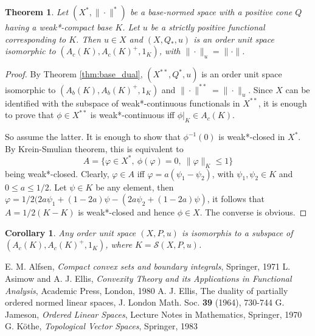 \documentclass[12pt]{article}
\newtheorem{thm}{Theorem}
\newtheorem{coro}{Corollary}
\theoremstyle{remark}
\newcommand{\<}{\langle}
\begin{document}
\begin{thm} Let $(X^*,\|\cdot\|^*)$ be a base-normed space with a positive cone $Q$ having a weak*-compact base $K$. Let $u$ be a strictly positive functional corresponding to $K$.  
Then $u\in X$ and $(X,Q_*,u)$ is an order unit space isomorphic to $(A_c(K),A_c(K)^+,1_K)$, with  $\|\cdot\|_u=\|\cdot\|$.

\end{thm}

\begin{proof}  By Theorem \ref{thm:base_dual}, $(X^{**},Q^*,u)$ is an order unit space  isomorphic to $(A_b(K),A_b(K)^+,1_K)$
 and $\|\cdot\|^{**}=\|\cdot\|_u$. Since $X$ can be identified with the subspace of weak*-continuous functionals in $X^{**}$, it is enough to prove that $\phi\in X^{**}$ is weak*-continuous iff $\phi|_K\in A_c(K)$. 

So assume the latter. It is enough to show that $\phi^{-1}(0)$ is weak*-closed in $X^*$. By Krein-Smulian theorem, this is equivalent to 
\[
A=\{\varphi\in X^*,\ \phi(\varphi)=0,\ \|\varphi\|_K\le 1\}
\]
being weak*-closed. Clearly, $\varphi\in A$ iff $\varphi=a(\psi_1-\psi_2)$, with $\psi_1,\psi_2\in K$ and $0\le a\le 1/2$. Let $\psi\in K$ be any element, then $\varphi= 1/2(2a\psi_1+(1-2a)\psi -(2a\psi_2+(1-2a)\psi)$, it follows that $A=1/2(K-K)$ 
 is weak*-closed and hence $\phi\in X$. The converse is obvious.


\end{proof}

\begin{coro} Any order unit space $(X,P,u)$ is isomorphis to a subspace of $(A_c(K), A_c(K)^+,1_K)$, where $K=\mathcal S(X,P,u)$.

\end{coro}



\begin{thebibliography}{99}
 E. M. Alfsen, \emph{Compact convex sets and boundary integrals}, Springer, 1971
 L. Asimow and A. J. Ellis, \emph{ Convexity Theory and its Applications in Functional Analysis}, Academic Press, London, 1980
 A. J. Ellis, The duality of partially ordered normed linear spaces, J. London Math. Soc. \textbf{39} (1964), 730-744
G. Jameson, \emph{Ordered Linear Spaces}, Lecture Notes in Mathematics, Springer, 1970
 G. K\" othe, \emph{Topological Vector Spaces}, Springer, 1983
\end{thebibliography}
\end{document}
